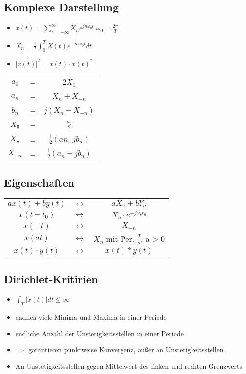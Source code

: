 \documentclass{article}
\begin{document}
\subsection{Komplexe Darstellung}
\begin{itemize}
\item $x(t) = \sum_{n = - \infty}^\infty X_ne^{jn\omega_0t} \; \omega_0 = \frac{2\pi}{T}$
\item $X_n = \frac{1}{T} \int_0^T X(t) e^{-jn\omega_0t}dt$
\item $|x(t)|^2 = x(t)\cdot x(t)^*$
\end{itemize}
\begin{tabular}{c  c c}
$a_0$ &=& $2X_0$ \\
 $a_n$&= & $X_n +X_{-n}$ \\
 $b_n$&= & $j(X_n-X_{-n})$ \\
 $X_0$&= & $\frac{a_0}{2}$ \\
 $X_n$ &=& $\frac{1}{2}(an_-jb_n)$ \\
 $X_{-n}$ &=& $\frac{1}{2}(a_n+jb_n)$ \\
 \end{tabular}


\subsection{Eigenschaften}
\begin{tabular}{c c c}
$ax(t) + by(t)$ &$\leftrightarrow$& $aX_n+bY_n$ \\
$x(t-t_0)$ &$\leftrightarrow$& $X_n\cdot e^{-j\omega_0t_0}$ \\
$x(-t)$ &$\leftrightarrow$& $X_{-n}$ \\
$x(at)$ &$\leftrightarrow$& $X_n$ mit Per. $\frac{T}{a}$, a > 0 \\
$x(t)\cdot y(t)$ &$\leftrightarrow$& $x(t)*y(t)$ \\
\end{tabular}

\subsection{Dirichlet-Kritirien}
\begin{itemize}
\item $\int_T |x(t)|dt \leq \infty$
\item endlich viele Minima und Maxima in einer Periode
\item endliche Anzahl der Unstetigkeitsstellen in einer Periode
\item $\Rightarrow$ garantieren punktweise Konvergenz, außer an Unstetigkeitsstellen
\item An Unstetigkeitsstellen gegen Mittelwert des linken und rechten Grenzwerts
\end{itemize}
\end{document}
